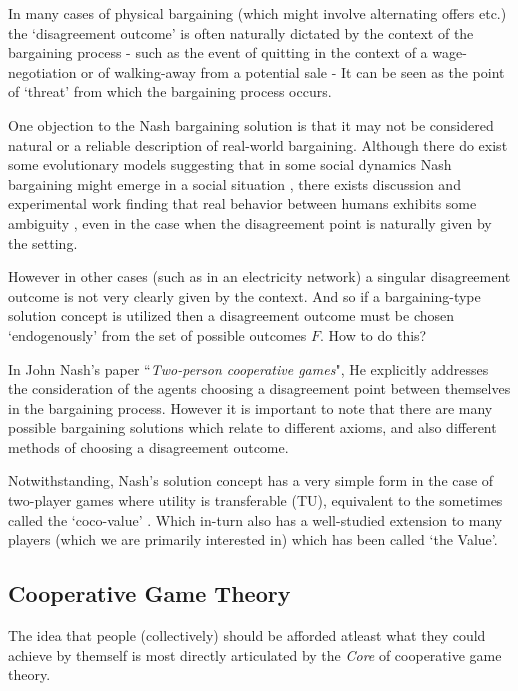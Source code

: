 In many cases of physical bargaining (which might involve alternating offers etc.) the `disagreement outcome' is often naturally dictated by the context of the bargaining process - 
such as the event of quitting in the context of a wage-negotiation or of walking-away from a potential sale
- It can be seen as the point of `threat' from which the bargaining process occurs.\cite{nash2}

One objection to the Nash bargaining solution is that it may not be considered natural or a reliable description of real-world bargaining.
Although there do exist some evolutionary models suggesting that in some social dynamics Nash bargaining might emerge in a social situation \cite{articlechoakihiko}, there exists discussion and experimental work finding that real behavior between humans exhibits some ambiguity \cite{KROLL2014261}, even in the case when the disagreement point is naturally given by the setting.

However in other cases (such as in an electricity network) a singular disagreement outcome is not very clearly given by the context.
And so if a bargaining-type solution concept is utilized then a disagreement outcome must be chosen `endogenously' from the set of possible outcomes $F$.
How to do this?

In John Nash's paper ``\textit{Two-person cooperative games}"\cite{nash2}, He explicitly addresses the consideration of the agents choosing a disagreement point between themselves in the bargaining process. However it is important to note that there are many possible bargaining solutions\cite{smorodinsky,tempered} which relate to different axioms,
 and also different methods of choosing a disagreement outcome.\cite{bozbay,alter_bargaining1,tale1}


Notwithstanding, Nash's solution concept has a very simple form in the case of two-player games where utility is transferable (TU), equivalent to the sometimes called the `coco-value' \cite{kalai1,Kalai2010}.
Which in-turn also has a well-studied extension to many players (which we are primarily interested in) which has been called `the Value'.\cite{values1,values2,values3}


\subsection{Cooperative Game Theory}

The idea that people (collectively) should be afforded atleast what they could achieve by themself is most directly articulated by the \textit{Core} of cooperative game theory.

